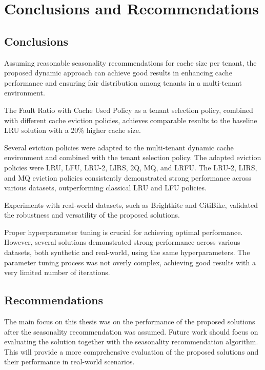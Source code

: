 \chapter{Conclusions and Recommendations}

\section{Conclusions}

Assuming reasonable seasonality recommendations for cache size per tenant, the proposed 
dynamic approach can achieve good results in enhancing cache performance and ensuring fair 
distribution among tenants in a multi-tenant environment.

The Fault Ratio with Cache Used Policy as a tenant selection policy, combined with different 
cache eviction policies, achieves comparable results to the baseline LRU solution with a 20\% 
higher cache size.

Several eviction policies were adapted to the multi-tenant dynamic cache environment and 
combined with the tenant selection policy. The adapted eviction policies were LRU, LFU, LRU-2, 
LIRS, 2Q, MQ, and LRFU. The LRU-2, LIRS, and MQ eviction policies consistently demonstrated 
strong performance across various datasets, outperforming classical LRU and LFU policies.

Experiments with real-world datasets, such as Brightkite and CitiBike, validated the 
robustness and versatility of the proposed solutions.

Proper hyperparameter tuning is crucial for achieving optimal performance. However, several 
solutions demonstrated strong performance across various datasets, both synthetic and 
real-world, using the same hyperparameters. The parameter tuning process was not overly 
complex, achieving good results with a very limited number of iterations.

\section{Recommendations}

The main focus on this thesis was on the performance of the proposed solutions after the 
seasonality recommendation was assumed. Future work should focus on evaluating the solution 
together with the seasonality recommendation algorithm. This will provide a more comprehensive
evaluation of the proposed solutions and their performance in real-world scenarios.

